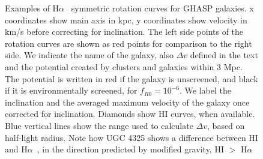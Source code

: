 \documentclass[useAMS,usenatbib,twocolumn]{mn2e}
\newcommand{\ha}{H$\alpha$}
\begin{document}
\begin{figure}
\caption{Examples of \ha~ symmetric rotation curves for GHASP galaxies.  x
coordinates show main axis in kpc, y coordinates show velocity in km/s before 
correcting for inclination. The
left side points of the rotation curves are shown as red points for comparison 
to the right side. We indicate the
name of the galaxy, also $\Delta v$ defined in the text and the
potential created by clusters and galaxies within 3 Mpc. 
The potential is written 
in red if the galaxy is unscreened, 
and black if it is environmentally screened, for $f_{R0}=10^{-6}$. 
We label the inclination and the averaged maximum velocity of the galaxy
once corrected for inclination.
Diamonds show HI curves, when available. Blue vertical lines show the range 
used to calculate $\Delta v$, based on half-light radius. Note how UGC 4325
shows a difference between HI and \ha~, 
in the direction predicted by modified gravity, HI $>$ \ha{}
\label{fig:GHASPsym}}
\end{figure}
\end{document}
